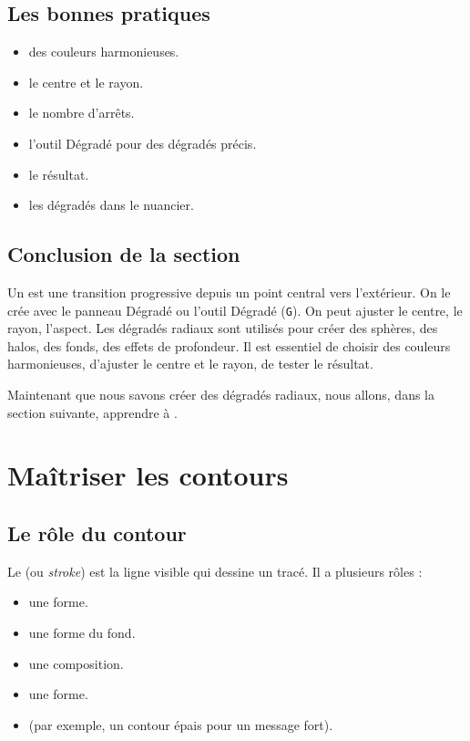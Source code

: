 \subsection{Les bonnes pratiques}

\begin{itemize}
    \item {} des couleurs harmonieuses.
    \item {} le centre et le rayon.
    \item {} le nombre d'arrêts.
    \item {} l'outil Dégradé pour des dégradés précis.
    \item {} le résultat.
    \item {} les dégradés dans le nuancier.
\end{itemize}

\subsection*{Conclusion de la section}

Un  est une transition progressive depuis un point central vers l'extérieur. On le crée avec le panneau Dégradé ou l'outil Dégradé (\texttt{G}). On peut ajuster le centre, le rayon, l'aspect. Les dégradés radiaux sont utilisés pour créer des sphères, des halos, des fonds, des effets de profondeur. Il est essentiel de choisir des couleurs harmonieuses, d'ajuster le centre et le rayon, de tester le résultat.

Maintenant que nous savons créer des dégradés radiaux, nous allons, dans la section suivante, apprendre à .

\section{Maîtriser les contours}

\subsection{Le rôle du contour}

Le  (ou \emph{stroke}) est la ligne visible qui dessine un tracé. Il a plusieurs rôles :

\begin{itemize}
    \item {} une forme.
    \item {} une forme du fond.
    \item {} une composition.
    \item {} une forme.
    \item {} (par exemple, un contour épais pour un message fort).
\end{itemize}

